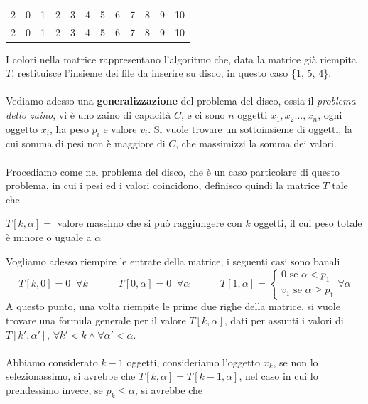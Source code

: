 \documentclass[12pt, letterpaper]{article}
\newcommand{\acc}{\\\hphantom{}\\}
\begin{document}
\begin{center}
\begin{tabular}{c|ccccccccccc}
        2                         & 0 & 1                         & 2                         & 3                         & 4                         & 5                         & 6                                                & 7                         & 8                         & 9                         & \cellcolor[HTML]{9AFF99}10                       \\
        2                         & 0 & 1                         & 2                         & 3                         & 4                         & 5                         & 6                                                & 7                         & 8                         & 9                         & \cellcolor[HTML]{FFCCC9}10
    \end{tabular}
\end{center}
I colori nella matrice rappresentano l'algoritmo che,
data la matrice già riempita $T$, restituisce l'insieme dei file da inserire su disco, in questo caso \{1, 5, 4\}. \acc
Vediamo adesso una \textbf{generalizzazione} del problema del disco, ossia il \textit{problema dello zaino}, vi è uno zaino
di capacità $C$, e ci sono $n$ oggetti $x_1,x_2\dots,x_n$, ogni oggetto $x_i$, ha peso $p_i$ e valore $v_i$. Si vuole trovare un
sottoinsieme di oggetti, la cui somma di pesi non è maggiore di $C$, che massimizzi la somma dei valori.\acc
Procediamo come nel problema del disco, che è un caso particolare di questo problema, in cui i pesi ed i valori coincidono,
definisco quindi la matrice $T$ tale che\begin{center}
    $T[k,\alpha]=$ valore massimo che si può raggiungere con $k$ oggetti, il cui peso totale è minore o uguale a $\alpha$
\end{center}
Vogliamo adesso riempire le entrate della matrice, i seguenti casi sono banali
$$T[k,0]=0\;\;\forall k\;\;\;\;\;\;\;\;\;\;\;T[0,\alpha]=0\;\;\forall \alpha\;\;\;\;\;\;\;\;\;\;\;T[1,\alpha]=\begin{cases}
        0\text{ se }\alpha<p_1 \\
        v_1\text{ se }\alpha\ge p_1
    \end{cases}\forall \alpha$$
A questo punto, una volta riempite le prime due righe della matrice, si vuole trovare una formula generale per
il valore $T[k,\alpha]$, dati
per assunti i valori di $T[k',\alpha']$, $\forall k'<k\land \forall \alpha'<\alpha$. \acc
Abbiamo considerato $k-1$ oggetti, consideriamo l'oggetto $x_k$, se non lo selezionassimo, si avrebbe che
$T[k,\alpha]=T[k-1,\alpha]$, nel caso in cui lo prendessimo invece, se $p_k\le \alpha$, si avrebbe che
\end{document}
